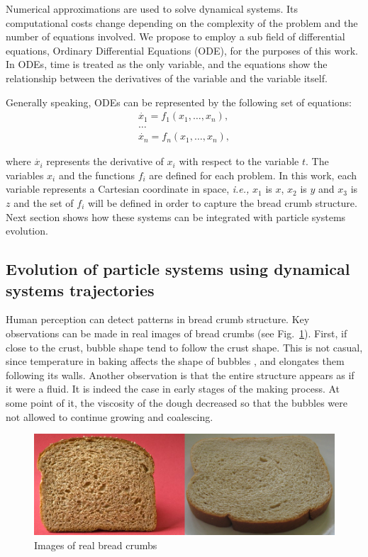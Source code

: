 \documentclass[oneside,a4paper,english,links]{amca}
\begin{document}
Numerical approximations are used to solve dynamical systems. Its computational costs change depending on the complexity of the problem and the number of equations involved. We propose to employ a sub field of differential equations, Ordinary Differential Equations (ODE), for the purposes of this work. In ODEs, time is treated as the only variable, and the equations show the relationship between the derivatives of the variable and the variable itself. 

Generally speaking, ODEs can be represented by the following set of equations:
\begin{equation} \label{eq:simple}  
  \begin{aligned}
    \dot{x_{1}} = f_{1}(x_{1},\ldots,x_{n}),\\
    \ldots\\
    \dot{x_{n}} = f_{n}(x_{1},\ldots,x_{n}),
  \end{aligned}
\end{equation}

where $\dot{x_{i}}$ represents the derivative of $x_{i}$ with respect to the variable $t$. The variables $x_{i}$ and the functions $f_{i}$ are defined for each problem. In this work, each variable represents a Cartesian coordinate in space, {\em i.e.,} $x_{1}$ is $x$, $x_{2}$ is $y$ and $x_{3}$ is $z$ and the set of $f_{i}$ will be defined in order to capture the bread crumb structure. Next section shows how these systems can be integrated with particle systems evolution.

\subsection{Evolution of particle systems using dynamical systems trajectories}

Human perception can detect patterns in bread crumb structure. Key observations can be made in real images of bread crumbs (see Fig.~\ref{fg:fig2}). First, if close to the crust, bubble shape tend to follow the crust shape. This is not casual, since temperature in baking affects the shape of bubbles \citep{Scanlon2001}, and elongates them following its walls. Another observation is that the entire structure appears as if it were a fluid. It is indeed the case in early stages of the making process. At some point of it, the viscosity of the dough decreased so that the bubbles were not allowed to continue growing and coalescing.

\begin{figure}[htb!]
  \centerline{\includegraphics[scale=0.45]{fig2}}
  \caption{Images of real bread crumbs}
  \label{fg:fig2}
\end{figure}
\end{document}
